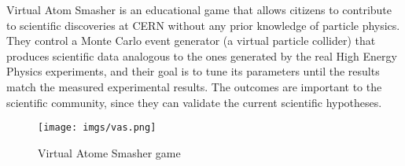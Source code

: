 \documentclass{article}
\begin{document}
Virtual Atom Smasher is an educational game that	allows citizens	to contribute to scientific discoveries at	CERN without any prior knowledge	of particle physics. They	control a Monte Carlo event generator (a virtual	particle collider) that produces scientific	data	analogous to the ones generated by the real High Energy Physics experiments, and their goal is to tune its parameters until the results match the measured	experimental results. The outcomes are important to the scientific community, since they can validate the current scientific hypotheses.

\begin{figure}[th]
  \begin{center}
		\texttt{[image: imgs/vas.png]}
  \end{center}
\caption{Virtual Atome Smasher game}
\label{img:vas}
\end{figure}
\end{document}
